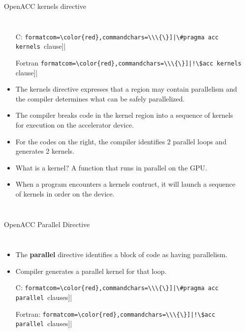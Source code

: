 \documentclass[c,mathserif,compress,xcolor=svgnames]{beamer}
\newcommand{\Verbred}[1]{\Verb[formatcom=\color{red},commandchars=\\\{\}]|#1|}
\newenvironment{eblock}[0]
{
\begin{beamerboxesrounded}[upper=uppercol2,lower=lowercol2,shadow=true]}
{\end{beamerboxesrounded}}
\begin{document}
\begin{frame}[fragile]{\small OpenACC kernels directive}
  \begin{columns}
    \begin{itemize}
      \item[C:] \Verbred{\#pragma acc kernels [clause]}
      \item[Fortran] \Verbred{!\$acc kernels [clause]}
      \item The kernels directive expresses that a region may contain parallelism and the compiler determines what can be safely parallelized.
      \item The compiler breaks code in the kernel region into a sequence of kernels for execution on the accelerator device.
      \item For the codes on the right, the compiler identifies 2 parallel loops and generates 2 kernels.
      \item {\color{red}What is a kernel?} {\color{DarkGreen}A function that runs in parallel on the GPU.}
      \item When a program encounters a kernels contruct, it will launch a sequence of kernels in order on the device.
    \end{itemize}
    \begin{eblock}{}
      
      
    \end{eblock}
  \end{columns}
\end{frame}

\begin{frame}[fragile]{\small OpenACC Parallel Directive}
  \begin{columns}
    \begin{itemize}
      \item The {\bf parallel} directive identifies a block of code as having parallelism.
      \item Compiler generates a parallel kernel for that loop.
      \item[C:] \Verbred{\#pragma acc parallel [clauses]}
      \item[Fortran:] \Verbred{!\$acc parallel [clauses]}
    \end{itemize}
    \begin{eblock}{}
      
      
    \end{eblock}
  \end{columns}
\end{frame}
\end{document}
